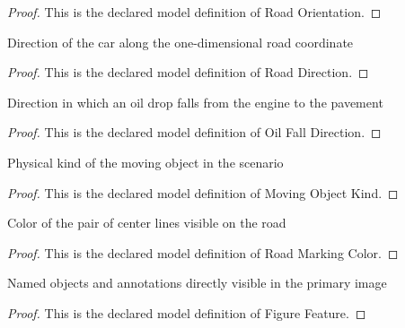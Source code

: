 \begin{proof}
  This is the declared model definition of Road Orientation.
\end{proof}
\begin{definition}
  \label{def:physics:phyx-mini-0668:phyxminiproblems-problemphyxmini0668-roaddirection}
  Direction of the car along the one-dimensional road coordinate
\end{definition}
\begin{proof}
  This is the declared model definition of Road Direction.
\end{proof}
\begin{definition}
  \label{def:physics:phyx-mini-0668:phyxminiproblems-problemphyxmini0668-oilfalldirection}
  Direction in which an oil drop falls from the engine to the pavement
\end{definition}
\begin{proof}
  This is the declared model definition of Oil Fall Direction.
\end{proof}
\begin{definition}
  \label{def:physics:phyx-mini-0668:phyxminiproblems-problemphyxmini0668-movingobjectkind}
  Physical kind of the moving object in the scenario
\end{definition}
\begin{proof}
  This is the declared model definition of Moving Object Kind.
\end{proof}
\begin{definition}
  \label{def:physics:phyx-mini-0668:phyxminiproblems-problemphyxmini0668-roadmarkingcolor}
  Color of the pair of center lines visible on the road
\end{definition}
\begin{proof}
  This is the declared model definition of Road Marking Color.
\end{proof}
\begin{definition}
  \label{def:physics:phyx-mini-0668:phyxminiproblems-problemphyxmini0668-figurefeature}
  Named objects and annotations directly visible in the primary image
\end{definition}
\begin{proof}
  This is the declared model definition of Figure Feature.
\end{proof}
